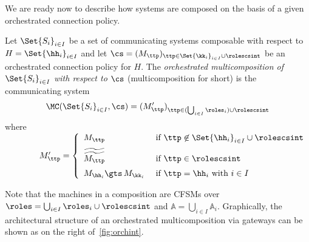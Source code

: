  We are ready now  to describe how systems are composed on the basis of a given orchestrated connection policy.


\begin{definition}
\label{def:multicomposition} 
Let $\Set{S_i}_{i\in I}$ be a set of communicating systems composable with respect to $H=\Set{\hh_i}_{i\in I}$ 
and let  $\cs=(M_{\ttp})_{\ttp\in \Set{\kk_i}_{i\in I}\cup\rolescsint}$  %
 be an orchestrated connection policy for $H$. 
The {\em orchestrated multicomposition of $\Set{S_i}_{i\in I}$ with respect to $\cs$} (multicomposition for short)
 is the communicating system 
$$\MC(\Set{S_i}_{i\in I}, \cs) =  (M'_\ttp)_{\ttp\in(\bigcup_{i\in I}\roles_i)\cup\rolescsint}$$
where\\
${\qquad\qquad}M'_\ttp = \left\{ \begin{array}{ll}
                          M_\ttp 
                                    &  \text{ if } \ttp\not\in\Set{\hh_i}_{i\in I}\cup \rolescsint  
                          \\[2mm]
                           \widetilde{\widetilde{M_\ttp}}  %
                                    &  \text{ if } \ttp\in \rolescsint %
                          \\[2mm]
                          M_{\hh_i}{\gts\,}M_{\kk_i} & \text{ if } \ttp=\hh_i \text{ with $i\in I$}
                           \end{array}
                 \right.$
\end{definition}

\smallskip
Note that the machines  in a composition are CFSMs over $\roles = \bigcup_{i\in I}\roles_i \cup \rolescsint$
 and $\mathbb{A} = \bigcup_{i\in I} \mathbb{A}_i$.
 Graphically, the architectural structure of an orchestrated multicomposition via gateways can be shown as on the right of~\cref{fig:orchint}.%






